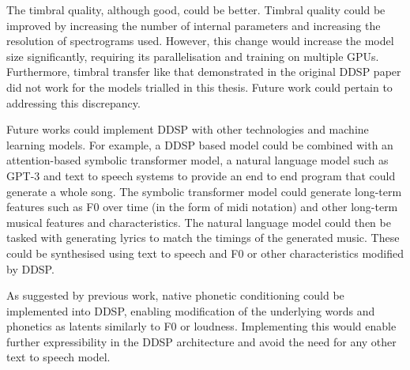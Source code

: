 The timbral quality, although good, could be better. Timbral quality could be improved by increasing the number of internal parameters and increasing the resolution of spectrograms used. However, this change would increase the model size significantly, requiring its parallelisation and training on multiple GPUs. Furthermore, timbral transfer like that demonstrated in the original DDSP paper did not work for the models trialled in this thesis. Future work could pertain to addressing this discrepancy.

Future works could implement DDSP with other technologies and machine learning models. For example, a DDSP based model could be combined with an attention-based symbolic transformer model, a natural language model such as GPT-3\cite{GPT3} and text to speech systems to provide an end to end program that could generate a whole song. The symbolic transformer model could generate long-term features such as F0 over time (in the form of midi notation) and other long-term musical features and characteristics. The natural language model could then be tasked with generating lyrics to match the timings of the generated music. These could be synthesised using text to speech and F0 or other characteristics modified by DDSP.

As suggested by previous work\cite{SingingDDSP}, native phonetic conditioning could be implemented into DDSP, enabling modification of the underlying words and phonetics as latents similarly to F0 or loudness. Implementing this would enable further expressibility in the DDSP architecture and avoid the need for any other text to speech model.